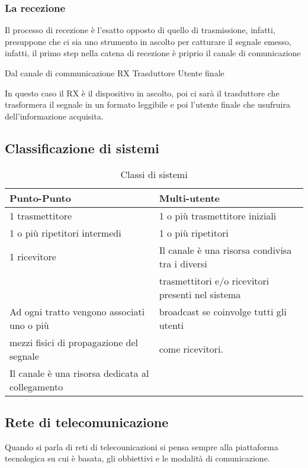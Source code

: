 \subsubsection{La recezione}
\label{sec:recezione}
Il processo di recezione è l'esatto opposto di quello di trasmissione, infatti,
presuppone che ci sia uno strumento in ascolto per catturare il segnale emesso,
infatti, il primo step nella catena di recezione è priprio il canale di comunicazione
\begin{center}
  Dal canale di communicazione \textrightarrow{} RX \textrightarrow{} Trasduttore
  \textrightarrow{} Utente finale
\end{center}
In questo caso il RX è il dispositivo in ascolto, poi ci sarà il trasduttore che
trasformera il segnale in un formato leggibile e poi l'utente finale che usufruira
dell'informazione acquisita.
\subsection{Classificazione di sistemi}
\label{sec:classidisistemi}
\begin{table}[ht]
  \centering
  \begin{tabular}{ll}
    \textbf{Punto-Punto} & \textbf{Multi-utente}\\\hline
    1 trasmettitore & 1 o più trasmettitore iniziali\\\hline
    1 o più ripetitori intermedi & 1 o più ripetitori\\\hline
    1 ricevitore & Il canale è una risorsa condivisa tra i diversi\\
                         & trasmettitori e/o ricevitori presenti nel sistema\\\hline
    Ad ogni tratto vengono associati uno o più & broadcast se coinvolge tutti gli utenti\\
    mezzi fisici di propagazione del segnale & come ricevitori.\\\hline
    Il canale è una risorsa dedicata al collegamento\\\hline
  \end{tabular}
  \caption{Classi di sistemi}
  \label{tab:classificazionedisistema}
\end{table}

\subsection{Rete di telecomunicazione}
\label{sec:retetele}

Quando si parla di reti di telecounicazioni si pensa sempre alla piattaforma tecnologica
su cui è basata, gli obbiettivi e le modalità di comunicazione.

